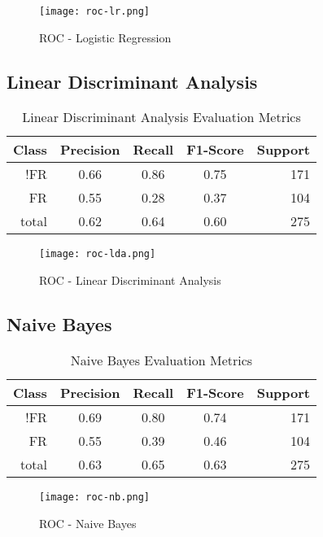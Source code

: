 \documentclass{article}
\begin{document}
\begin{figure}[h]
\texttt{[image: roc-lr.png]}
\caption{ROC - Logistic Regression}\label{fig:lr}
\centering
\end{figure}

\subsection{Linear Discriminant Analysis}

\begin{table}[!htb]
\setlength\tabcolsep{0pt} %
\footnotesize\centering
\smallskip 
\begin{tabular*}{\columnwidth}{@{\extracolsep{\fill}}rcccr}
\toprule
  Class&Precision&Recall&F1-Score&Support \\
\midrule
  !FR  & 0.66&0.86&0.75&171\\
  FR & 0.55&0.28&0.37&104 \\
  \midrule
total&0.62&0.64&0.60&275\\
\bottomrule
\end{tabular*}
\caption{Linear Discriminant Analysis Evaluation Metrics} \label{tab:lda}
\end{table}

\begin{figure}[h]
\texttt{[image: roc-lda.png]}
\caption{ROC - Linear Discriminant Analysis}\label{fig:lda}
\centering
\end{figure}

\subsection{Naive Bayes}
\begin{table}[!htb]
\setlength\tabcolsep{0pt} %
\footnotesize\centering
\smallskip 
\begin{tabular*}{\columnwidth}{@{\extracolsep{\fill}}rcccr}
\toprule
  Class&Precision&Recall&F1-Score&Support \\
\midrule
  !FR  & 0.69&0.80&0.74&171\\
  FR & 0.55&0.39&0.46&104 \\
  \midrule
total&0.63&0.65&0.63&275\\
\bottomrule
\end{tabular*}
\caption{Naive Bayes Evaluation Metrics} \label{tab:nb}
\end{table}

\begin{figure}[h]
\texttt{[image: roc-nb.png]}
\caption{ROC - Naive Bayes}\label{fig:nb}
\centering
\end{figure}
\end{document}
